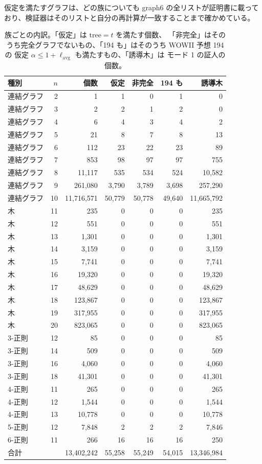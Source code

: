 \documentclass[paper=a4,fontsize=10.5pt,jafontsize=10.5pt]{jlreq}
\theoremstyle{plain}
\theoremstyle{definition}
\begin{document}
仮定を満たすグラフは、どの族についても graph6 の全リストが証明書に載っており、検証器はそのリストと自分の再計算が一致することまで確かめている。

\begin{table}[htbp]
\centering
\caption{族ごとの内訳。「仮定」は $\mathrm{tree} = t$ を満たす個数、
「非完全」はそのうち完全グラフでないもの、「194 も」はそのうち WOWII 予想 194 の
仮定 $\alpha \le 1 + \ell_{\mathrm{avg}}$ も満たすもの、「誘導木」は
モード 1 の証人の個数。}\label{tab:fams}
\begin{tabular}{lrrrrrr}
\toprule
種別 & $n$ & 個数 & 仮定 & 非完全 & 194 も & 誘導木 \\
\midrule
連結グラフ & 2 & 1 & 1 & 0 & 1 & 0 \\
連結グラフ & 3 & 2 & 2 & 1 & 2 & 0 \\
連結グラフ & 4 & 6 & 4 & 3 & 4 & 2 \\
連結グラフ & 5 & 21 & 8 & 7 & 8 & 13 \\
連結グラフ & 6 & 112 & 23 & 22 & 23 & 89 \\
連結グラフ & 7 & 853 & 98 & 97 & 97 & 755 \\
連結グラフ & 8 & 11,117 & 535 & 534 & 524 & 10,582 \\
連結グラフ & 9 & 261,080 & 3,790 & 3,789 & 3,698 & 257,290 \\
連結グラフ & 10 & 11,716,571 & 50,779 & 50,778 & 49,640 & 11,665,792 \\
木 & 11 & 235 & 0 & 0 & 0 & 235 \\
木 & 12 & 551 & 0 & 0 & 0 & 551 \\
木 & 13 & 1,301 & 0 & 0 & 0 & 1,301 \\
木 & 14 & 3,159 & 0 & 0 & 0 & 3,159 \\
木 & 15 & 7,741 & 0 & 0 & 0 & 7,741 \\
木 & 16 & 19,320 & 0 & 0 & 0 & 19,320 \\
木 & 17 & 48,629 & 0 & 0 & 0 & 48,629 \\
木 & 18 & 123,867 & 0 & 0 & 0 & 123,867 \\
木 & 19 & 317,955 & 0 & 0 & 0 & 317,955 \\
木 & 20 & 823,065 & 0 & 0 & 0 & 823,065 \\
3-正則 & 12 & 85 & 0 & 0 & 0 & 85 \\
3-正則 & 14 & 509 & 0 & 0 & 0 & 509 \\
3-正則 & 16 & 4,060 & 0 & 0 & 0 & 4,060 \\
3-正則 & 18 & 41,301 & 0 & 0 & 0 & 41,301 \\
4-正則 & 11 & 265 & 0 & 0 & 0 & 265 \\
4-正則 & 12 & 1,544 & 0 & 0 & 0 & 1,544 \\
4-正則 & 13 & 10,778 & 0 & 0 & 0 & 10,778 \\
5-正則 & 12 & 7,848 & 2 & 2 & 2 & 7,846 \\
6-正則 & 11 & 266 & 16 & 16 & 16 & 250 \\
\midrule
合計 & & 13,402,242 & 55,258 & 55,249 & 54,015 & 13,346,984 \\
\bottomrule
\end{tabular}
\end{table}
\end{document}
